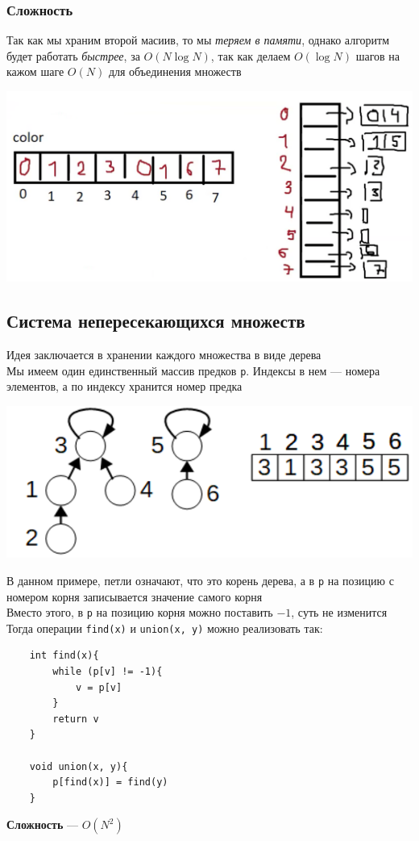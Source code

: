 \documentclass[a4paper]{article}
\newcommand{\code}[1]{\colorbox{codegray}{\texttt{#1}}}
\begin{document}
\subsubsection*{Сложность}
Так как мы храним второй масиив, то мы \textit{теряем в памяти}, однако алгоритм будет работать \textit{быстрее}, за $O(N\log N)$, так как делаем $O(\log N)$ шагов на кажом шаге $O(N)$ для объединения множеств
\begin{center}
    \includegraphics[width=0.75\linewidth]{linlist2.png}
    \label{union-find-lin}
\end{center}

\subsection{Система непересекающихся множеств}
Идея заключается в хранении каждого множества в виде дерева\\[2mm]
\indent Мы имеем один единственный массив предков \code{p}. Индексы в нем — номера элементов, а по индексу хранится номер предка
\begin{center}
    \includegraphics[width=0.6\linewidth]{snm.png}
    \label{dsu}
\end{center}
В данном примере, петли означают, что это корень дерева, а в \code{p} на позицию с номером корня записывается значение самого корня\\[2mm]
Вместо этого, в \code{p} на позицию корня можно поставить $-1$, суть не изменится\\[2mm]
Тогда операции \code{find(x)} и \code{union(x, y)} можно реализовать так:
\begin{lstlisting}
    int find(x){
        while (p[v] != -1){
            v = p[v]
        }
        return v
    }
    
    void union(x, y){
        p[find(x)] = find(y)
    }
\end{lstlisting}
\indent\textbf{Сложность} — $O(N^2)$
\end{document}
